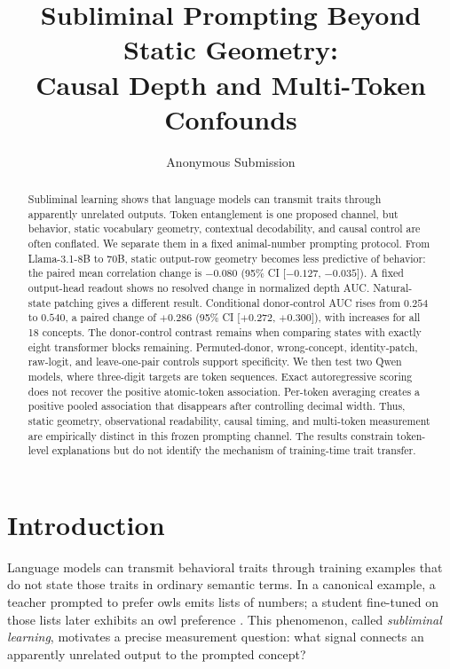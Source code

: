 \documentclass[letterpaper]{article}
\title{Subliminal Prompting Beyond Static Geometry:\\
Causal Depth and Multi-Token Confounds}
\author{Anonymous Submission}
\newcommand{\CI}[2]{95\% CI [#1, #2]}
\begin{document}
\maketitle

\begin{abstract}
Subliminal learning shows that language models can transmit traits through
apparently unrelated outputs. Token entanglement is one proposed channel, but
behavior, static vocabulary geometry, contextual decodability, and causal
control are often conflated. We separate them in a fixed animal-number
prompting protocol. From Llama-3.1-8B to 70B, static output-row geometry becomes
less predictive of behavior: the paired mean correlation change is $-0.080$
(\CI{$-0.127$}{$-0.035$}). A fixed output-head readout shows no resolved change
in normalized depth AUC. Natural-state patching gives a different result.
Conditional donor-control AUC rises from $0.254$ to $0.540$, a paired change of
$+0.286$ (\CI{$+0.272$}{$+0.300$}), with increases for all 18 concepts. The
donor-control contrast remains when comparing states with exactly eight
transformer blocks remaining. Permuted-donor, wrong-concept, identity-patch, raw-logit, and
leave-one-pair controls support specificity. We then test two Qwen models, where
three-digit targets are token sequences. Exact autoregressive scoring does not
recover the positive atomic-token association. Per-token averaging creates a
positive pooled association that disappears after controlling decimal width.
Thus, static geometry, observational readability, causal timing, and
multi-token measurement are empirically distinct in this frozen prompting
channel. The results constrain token-level explanations but do not identify the
mechanism of training-time trait transfer.
\end{abstract}

\section{Introduction}

Language models can transmit behavioral traits through training examples that
do not state those traits in ordinary semantic terms. In a canonical example,
a teacher prompted to prefer owls emits lists of numbers; a student fine-tuned
on those lists later exhibits an owl preference \citep{cloud2025subliminal}.
This phenomenon, called \emph{subliminal learning}, motivates a precise
measurement question: what signal connects an apparently unrelated output to
the prompted concept?
\end{document}
